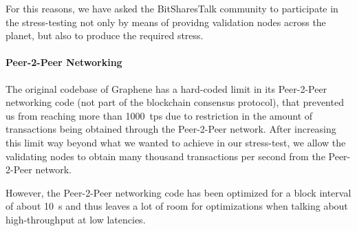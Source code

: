 For this reasons, we have asked the BitSharesTalk community to participate in
the stress-testing not only by means of providng validation nodes across the
planet, but also to produce the required stress.

\paragraph{Peer-2-Peer Networking}
The original codebase of Graphene has a hard-coded limit in its Peer-2-Peer
networking code (not part of the blockchain consensus protocol), that prevented
us from reaching more than \SI{1000}{tps} due to restriction in the amount of
transactions being obtained through the Peer-2-Peer network. After increasing
this limit way beyond what we wanted to achieve in our stress-test, we allow
the validating nodes to obtain many thousand transactions per second from the
Peer-2-Peer network.

However, the Peer-2-Peer networking code has been optimized for a block
interval of about \SI{10}{s} and thus leaves a lot of room for optimizations
when talking about high-throughput at low latencies.
